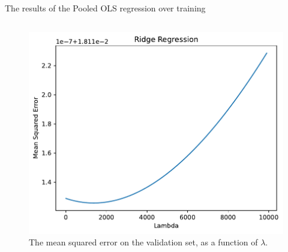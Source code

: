 \documentclass[hidelinks,12pt]{article}
\begin{document}
\FloatBarrier

\section{}
\subsection{}
\begin{table}[htbp]
    \centering
    \caption{The results of the Pooled OLS regression over training}
    \resizebox{.9\textwidth}{!}{}
\end{table}

\subsection{}
\begin{figure}[htbp]
    \centering
    \caption{The mean squared error on the validation set, as a function of $\lambda$.}
    \includegraphics[width=.95\textwidth]{out/2_2.pdf}
\end{figure}

\FloatBarrier
\end{document}
